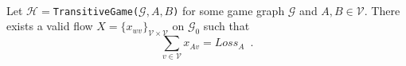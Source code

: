 \begin{lemma} \ \\
   \label{gameflow}
   Let $\mathcal{H} = $\texttt{TransitiveGame(}$\mathcal{G}, A, B$\texttt{)} for some game graph $\mathcal{G}$ and $A,
   B \in \mathcal{V}$. There exists a valid flow
   $X = \{x_{wv}\}_{\mathcal{V} \times \mathcal{V}}$ on $\mathcal{G}_0$ such that
   \begin{equation*}
      \sum\limits_{v \in \mathcal{V}}x_{Av} = Loss_A \enspace.
   \end{equation*}
\end{lemma}
